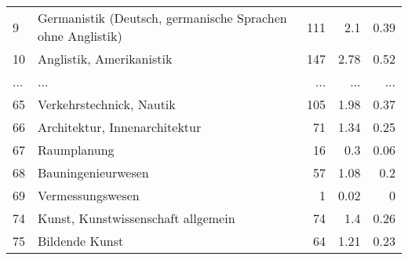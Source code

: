 \begin{longtable}{lXrrr}
        9 & \multicolumn{1}{X}{Germanistik (Deutsch, germanische Sprachen ohne Anglistik)} & %
          \num{111} &
          \num[round-mode=places,round-precision=2]{2.1} &
          \num[round-mode=places,round-precision=2]{0.39} \\
        10 & \multicolumn{1}{X}{Anglistik, Amerikanistik} & %
          \num{147} &
          \num[round-mode=places,round-precision=2]{2.78} &
          \num[round-mode=places,round-precision=2]{0.52} \\
       ... & ... & ... & ... & ... \\
        65 & \multicolumn{1}{X}{Verkehrstechnick, Nautik} & %
          \num{105} &
          \num[round-mode=places,round-precision=2]{1.98} &
          \num[round-mode=places,round-precision=2]{0.37} \\

        66 & \multicolumn{1}{X}{Architektur, Innenarchitektur} & %
          \num{71} &
          \num[round-mode=places,round-precision=2]{1.34} &
          \num[round-mode=places,round-precision=2]{0.25} \\

        67 & \multicolumn{1}{X}{Raumplanung} & %
          \num{16} &
          \num[round-mode=places,round-precision=2]{0.3} &
          \num[round-mode=places,round-precision=2]{0.06} \\

        68 & \multicolumn{1}{X}{Bauningenieurwesen} & %
          \num{57} &
          \num[round-mode=places,round-precision=2]{1.08} &
          \num[round-mode=places,round-precision=2]{0.2} \\

        69 & \multicolumn{1}{X}{Vermessungswesen} & %
          \num{1} &
          \num[round-mode=places,round-precision=2]{0.02} &
          \num[round-mode=places,round-precision=2]{0} \\

        74 & \multicolumn{1}{X}{Kunst, Kunstwissenschaft allgemein} & %
          \num{74} &
          \num[round-mode=places,round-precision=2]{1.4} &
          \num[round-mode=places,round-precision=2]{0.26} \\

        75 & \multicolumn{1}{X}{Bildende Kunst} & %
          \num{64} &
          \num[round-mode=places,round-precision=2]{1.21} &
          \num[round-mode=places,round-precision=2]{0.23} \\


\end{longtable}
